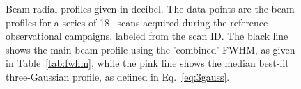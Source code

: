 \begin{figure}[!thbp]
  \caption[Stability of the beam profile]{{\lp Beam radial
    profiles given in decibel. %
    The data points are the beam profiles for a series of 18
    \bm\ scans acquired during the reference observational campaigns, labeled from the scan
    ID. The black line shows the main beam profile using the 'combined'
    FWHM, as given in Table~\ref{tab:fwhm}, while the pink
    line shows the median best-fit three-Gaussian profile, as defined
    in Eq.~\ref{eq:3gauss}.}}
  \label{fig:beam_prof}
\end{figure}



